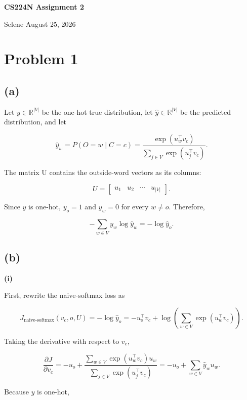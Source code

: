 \documentclass[a4paper,10pt]{article}
\begin{document}
\begin{center}
  {\Large\bfseries CS224N \textbar{} Assignment 2\par}
  \vspace{0.5em}
  Selene \quad\textperiodcentered\quad August 25, 2026
\end{center}
\vspace{0.7em}

\section{Problem 1}\label{problem-1}

\subsection{(a)}\label{a}

Let \(y \in \mathbb{R}^{\lvert V\rvert}\) be the one-hot true distribution, let \(\hat{y} \in \mathbb{R}^{\lvert V\rvert}\) be the predicted distribution, and let

\[
\hat{y}_w = P(O=w\mid C=c) = \frac{\exp(u_w^\top v_c)} {\sum_{j\in V}\exp(u_j^\top v_c)}.
\]

The matrix U contains the outside-word vectors as its columns:

\[
U = \begin{bmatrix}u_1 & u_2 & \cdots & u_{\lvert V\rvert}\end{bmatrix}.
\]

Since \(y\) is one-hot, \(y_o=1\) and \(y_w=0\) for every \(w\neq o\). Therefore,

\[
-\sum_{w\in V}y_w\log \hat{y}_w = -\log \hat{y}_o.
\]

\subsection{(b)}\label{b}

\textbf{(i)}

First, rewrite the naive-softmax loss as

\[
J_{\text{naive-softmax}}(v_c,o,U) = -\log \hat{y}_o = -u_o^\top v_c+ \log\left(\sum_{w\in V}\exp(u_w^\top v_c)\right).
\]

Taking the derivative with respect to \(v_c\),

\[
\frac{\partial J}{\partial v_c} = -u_o+ \frac{\sum_{w\in V}\exp(u_w^\top v_c)u_w} {\sum_{j\in V}\exp(u_j^\top v_c)} = -u_o + \sum_{w\in V}\hat{y}_w u_w.
\]

Because \(y\) is one-hot,
\end{document}
